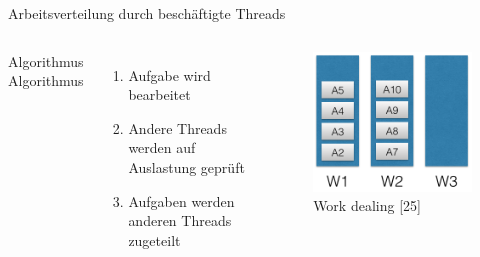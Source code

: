 \documentclass{beamer}
\begin{document}
\begin{frame}{Arbeitsverteilung durch besch\"aftigte Threads}
\begin{columns}

        Algorithmus
        Algorithmus
        \begin{enumerate}
        \item Aufgabe wird bearbeitet
        \item Andere Threads werden auf Auslastung gepr\"uft
        \item Aufgaben werden anderen Threads zugeteilt
        \end{enumerate}

        
        
        \begin{figure}
        \centering
        \includegraphics[width=1\columnwidth]{./assets/outOfWork.png}
        \caption{Work dealing \cite{Herlihy1}[25]}
        \label{fig:my_label}
        \end{figure}
\end{columns}
\end{frame}
\end{document}
